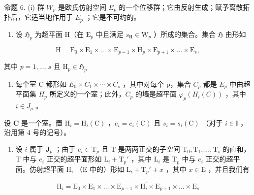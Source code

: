 命题 6. (i) 群 \(W_{p}\) 是欧氏仿射空间 \(E_{p}\) 的一个位移群；它由反射生成；赋予离散拓扑后，它适当地作用于 \(E_{p}\) ；它是不可约的。

\begin{enumerate}
\def\labelenumi{(\roman{enumi})}
\setcounter{enumi}{1}
\tightlist
\item
  设 \(\mathfrak{H}_p\) 为超平面 \(\mathrm{H}\)（在 \(\mathrm{E}_p\) 中且满足 \(s_{\mathrm{H}} \in \mathrm{W}_p\) ）所成的集合。集合 \(\mathfrak{H}\) 由形如
\end{enumerate}

\[
\mathrm{H} = \mathrm{E} _ {0} \times \mathrm{E} _ {1} \times \dots \times \mathrm{E} _ {p - 1} \times \mathrm{H} _ {p} \times \mathrm{E} _ {p + 1} \times \dots \times \mathrm{E} _ {s},
\]

其中 \(p = 1,\dots ,s\) 且 \(\mathrm{H}_p\in \mathfrak{H}_p\)

\begin{enumerate}
\def\labelenumi{(\roman{enumi})}
\setcounter{enumi}{2}
\tightlist
\item
  每个室 C 都形如 \(E_{0} \times C_{1} \times \cdots \times C_{s}\) ，其中对每个 p，集合 \(C_{p}\) 都是 \(E_{p}\) 中由超平面集 \(H_{p}\) 所定义的一个室；此外，\(C_{p}\) 的墙是超平面 \(\varphi_{p}(H_{i}(C))\) ，其中 \(i \in J_{p}\) 。
\end{enumerate}

设 \(\mathbf{C}\) 是一个室。置 \(\mathrm{H}_i = \mathrm{H}_i(\mathrm{C})\) ，\(e_i = e_i(\mathrm{C})\) 且 \(s_i = s_i(\mathrm{C})\) （对于 \(i \in \mathbb{I}\) ，沿用第 4 号的记号）。

\begin{enumerate}
\def\labelenumi{(\roman{enumi})}
\tightlist
\item
  设 \(i\) 属于 \(\mathbf{J}_p\) ；由于 \(e_i \in \mathrm{T}_p\) 且 \(\mathrm{T}\) 是两两正交的子空间 \(\mathrm{T}_0, \mathrm{T}_1, \ldots, \mathrm{T}_s\) 的直和，\(\mathrm{T}\) 中与 \(e_i\) 正交的超平面形如 \(\mathrm{L}_i + \mathrm{T}_p'\) ，其中 \(\mathrm{L}_i\) 是 \(\mathrm{T}_p\) 中与 \(e_i\) 正交的超平面。仿射超平面 \(\mathrm{H}_i\) （\(\mathrm{E}\) 中的）形如 \(\mathrm{L}_i + \mathrm{T}_p' + x\) ，其中 \(x \in \mathrm{E}\) ，并且我们有
\end{enumerate}

\[
\mathrm{H} _ {i} = \mathrm{E} _ {0} \times \mathrm{E} _ {1} \times \dots \times \mathrm{E} _ {p - 1} \times \mathrm{H} _ {i} ^ {\prime} \times \mathrm{E} _ {p + 1} \times \dots \times \mathrm{E} _ {s}\tag{6}
\]


